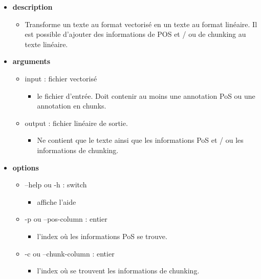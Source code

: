 \documentclass[manual-fr.tex]{subfiles}
\begin{document}
\begin{itemize}
    \item[] \textbf{description}
        \begin{itemize}
            \item[] Transforme un texte au format vectorisé en un texte au format linéaire. Il est possible d'ajouter des informations de
				POS et / ou de chunking au texte linéaire.
        \end{itemize}
    \item[] \textbf{arguments}
        \begin{itemize}
            \item[] input : fichier vectorisé
                \begin{itemize}
                    \item[] le fichier d'entrée. Doit contenir au moins une annotation PoS ou une annotation en chunks.
                \end{itemize}
            \item[] output : fichier linéaire de sortie.
                \begin{itemize}
                    \item[] Ne contient que le texte ainsi que les informations PoS et / ou les informations de chunking.
                \end{itemize}
        \end{itemize}
    \item[] \textbf{options}
        \begin{itemize}
            \item[] --help ou -h : switch
                \begin{itemize}
                    \item[] affiche l'aide
                \end{itemize}
            \item[] -p ou --pos-column : entier
                \begin{itemize}
                    \item[] l'index où les informations PoS se trouve.
                \end{itemize}
            \item[] -c ou --chunk-column : entier
                \begin{itemize}
                    \item[] l'index où se trouvent les informations de chunking.
                \end{itemize}

\end{itemize}
\end{itemize}
\end{document}
